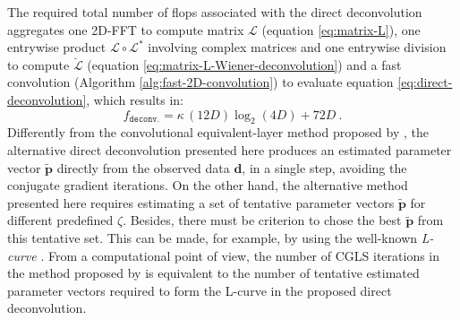 The required total number of flops associated with the direct deconvolution 
aggregates one 2D-FFT to compute matrix $\boldsymbol{\mathcal{L}}$ (equation \ref{eq:matrix-L}),
one entrywise product $\boldsymbol{\mathcal{L}} \circ \boldsymbol{\mathcal{L}}^{\ast}$ involving complex matrices and
one entrywise division to compute $\breve{\boldsymbol{\mathcal{L}}}$ (equation \ref{eq:matrix-L-Wiener-deconvolution}) and
a fast convolution (Algorithm \ref{alg:fast-2D-convolution}) to evaluate equation \ref{eq:direct-deconvolution},
which results in:
\begin{equation}
	f_{\mathtt{deconv.}} = \kappa \, (12D)\log_{2}(4D) + 72D \: .
	\label{flops:direct-deconv}
\end{equation}
Differently from the convolutional equivalent-layer method proposed by 
\citet{takahashi-etal2020, takahashi-etal2022}, the alternative direct deconvolution presented here 
produces an estimated parameter vector $\tilde{\mathbf{p}}$ directly from the observed data $\mathbf{d}$, in a single step,
avoiding the conjugate gradient iterations.
On the other hand, the alternative method presented here requires estimating a set of tentative parameter vectors $\tilde{\mathbf{p}}$
for different predefined $\zeta$. Besides, there must be criterion to chose the best $\tilde{\mathbf{p}}$ from this tentative set.
This can be made, for example, by using the well-known \textit{L-curve} \citep{hansen1992}.
From a computational point of view, the number of CGLS iterations in the method proposed by \citet{takahashi-etal2020, takahashi-etal2022}
is equivalent to the number of tentative estimated parameter vectors required to form the L-curve in the proposed
direct deconvolution.